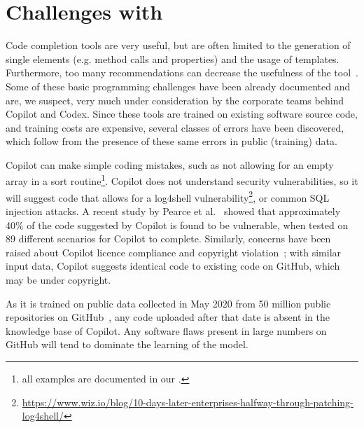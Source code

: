 \section{Challenges with \cct{}}
\label{challenges}
Code completion tools are very useful, but are often limited to the generation of single elements (e.g. method calls and properties) and the usage of templates. Furthermore, too many recommendations can decrease the usefulness of the tool~\cite{Proksch2015}. 
Some of these basic programming challenges have been already documented and are, we suspect, very much under consideration by the corporate teams behind Copilot and Codex. Since these tools are trained on existing software source code, and training costs are expensive, several classes of errors have been discovered, which follow from the presence of these same errors in public (training) data.

Copilot can make simple coding mistakes, such as not allowing for an empty array in a sort routine\footnote{all examples are documented in our \repl{}.}. Copilot does not understand security vulnerabilities, so it will suggest code that allows for a \textsf{log4shell} vulnerability\footnote{\url{https://www.wiz.io/blog/10-days-later-enterprises-halfway-through-patching-log4shell/}}, or common SQL injection attacks. A recent study by Pearce et al.~\cite{copilot_security} showed that approximately 40\% of the code suggested by Copilot is found to be vulnerable, when tested on 89 different scenarios for Copilot to complete.
Similarly, concerns have been raised about Copilot licence compliance and copyright violation~\cite{code_clone}; with similar input data, Copilot suggests identical code to existing code on GitHub, which may be under copyright. 

As it is trained on public data collected in May 2020 from 50 million public repositories on GitHub~\cite{copilot}, any code uploaded after that date is absent in the knowledge base of Copilot. 
Any software flaws present in large numbers on GitHub will tend to dominate the learning of the model.


